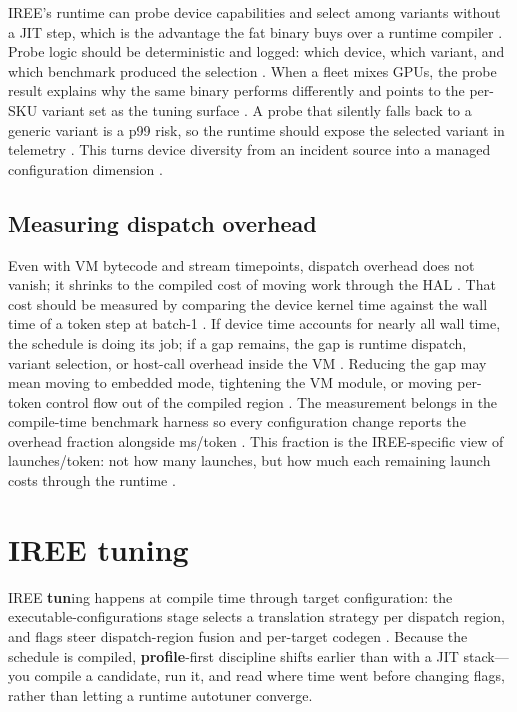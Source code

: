 IREE's runtime can probe device capabilities and select among variants without a JIT step, which is the advantage the fat binary buys over a runtime compiler \citep{iree2024,taxbreak2026}. Probe logic should be deterministic and logged: which device, which variant, and which benchmark produced the selection \citep{patel2025llminference,memoryfloor2026}. When a fleet mixes GPUs, the probe result explains why the same binary performs differently and points to the per-SKU variant set as the tuning surface \citep{nvidia2022hopper,amd2024aie}. A probe that silently falls back to a generic variant is a p99 risk, so the runtime should expose the selected variant in telemetry \citep{kwon2023vllm,memoryfloor2026}. This turns device diversity from an incident source into a managed configuration dimension \citep{chen2020compilerbasedhardw,patel2025llminference}.

\subsection{Measuring dispatch overhead}

Even with VM bytecode and stream timepoints, dispatch overhead does not vanish; it shrinks to the compiled cost of moving work through the HAL \citep{iree2024,taxbreak2026}. That cost should be measured by comparing the device kernel time against the wall time of a token step at batch-1 \citep{patel2025llminference,memoryfloor2026}. If device time accounts for nearly all wall time, the schedule is doing its job; if a gap remains, the gap is runtime dispatch, variant selection, or host-call overhead inside the VM \citep{iree2024,patel2025llminference}. Reducing the gap may mean moving to embedded mode, tightening the VM module, or moving per-token control flow out of the compiled region \citep{chen2020compilerbasedhardw,taxbreak2026}. The measurement belongs in the compile-time benchmark harness so every configuration change reports the overhead fraction alongside ms/token \citep{memoryfloor2026,iree2024}. This fraction is the IREE-specific view of launches/token: not how many launches, but how much each remaining launch costs through the runtime \citep{nvidia2024cudagraphs,memoryfloor2026}.

\section{IREE tuning}
\label{sec:ch18_iree_tuning}

IREE \textbf{tun}ing happens at compile time through target configuration: the executable-configurations stage selects a translation strategy per dispatch region, and flags steer dispatch-region fusion and per-target codegen \citep{iree2024}. Because the schedule is compiled, \textbf{profile}-first discipline shifts earlier than with a JIT stack---you compile a candidate, run it, and read where time went before changing flags, rather than letting a runtime autotuner converge.

